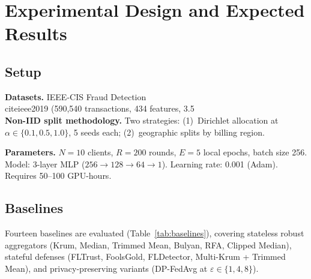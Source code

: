 \documentclass[10pt,journal]{IEEEtran}
\begin{document}
\section{Experimental Design and Expected Results}
\label{sec:experiments}

\subsection{Setup}

\textbf{Datasets.} IEEE-CIS Fraud Detection~\\cite{ieee2019} (590,540 transactions, 434 features, 3.5\\%

\textbf{Non-IID split methodology.} Two strategies: (1)~Dirichlet allocation at $\alpha \in \{0.1, 0.5, 1.0\}$, 5 seeds each; (2)~geographic splits by billing region.

\textbf{Parameters.} $N=10$ clients, $R=200$ rounds, $E=5$ local epochs, batch size 256. Model: 3-layer MLP ($256\to128\to64\to1$). Learning rate: 0.001 (Adam). Requires 50--100 GPU-hours.

\subsection{Baselines}\label{sec:baselines}

Fourteen baselines are evaluated (Table~\ref{tab:baselines}), covering stateless robust aggregators (Krum, Median, Trimmed Mean, Bulyan, RFA, Clipped Median), stateful defenses (FLTrust, FoolsGold, FLDetector, Multi-Krum + Trimmed Mean), and privacy-preserving variants (DP-FedAvg at $\varepsilon \in \{1, 4, 8\}$).
\end{document}
